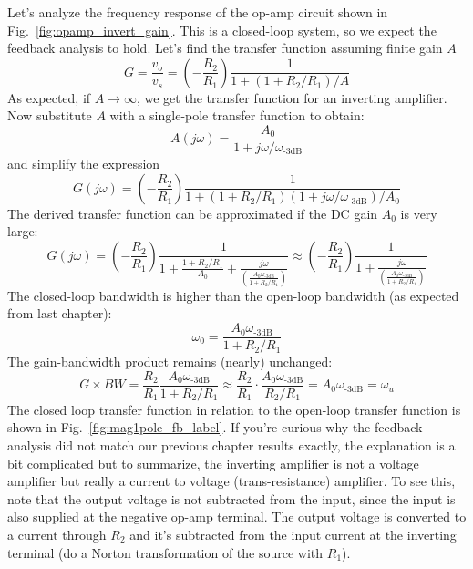 Let's analyze the frequency response of the op-amp circuit shown in Fig.~\ref{fig:opamp_invert_gain}.  This is a closed-loop system, so we expect the feedback analysis to hold.  Let's find the transfer function assuming finite gain $A$
\begin{equation}
  G = \frac{v_o}{v_s} = \left(-\frac{R_2}{R_1}\right) \frac{1}{1 + (1+R_2/R_1)/A}
\end{equation}
As expected, if $A \rightarrow \infty$, we get the transfer function for an inverting amplifier.  Now  substitute $A$ with a single-pole transfer function to obtain:
\begin{equation} 
	A(j\omega) = \frac{A_0}{1 + j\omega/\omega_{\text{-3dB}}}
\end{equation}
and simplify the expression 
\begin{equation}
  G(j\omega) = \left(-\frac{R_2}{R_1}\right)  \frac{1}{1 + (1+R_2/R_1)(1+ j\omega/\omega_\text{-3dB})/A_0}
\end{equation}
The derived transfer function can be approximated if the DC gain $A_0$ is very large:
\begin{equation}
  G(j\omega) = \left(-\frac{R_2}{R_1}\right)  \frac{1}{1 + \frac{1+R_2/R_1}{A_0} + 
    \frac{j\omega}{\left( \frac{A_0 \omega_\text{-3dB}}{1 + R_2/R_1} \right)}} \approx
     \left(-\frac{R_2}{R_1}\right)\frac{1}{1 + \frac{j\omega}{\left( \frac{A_0 \omega_\text{-3dB}}{1 + R_2/R_1} \right)}}
\end{equation}
The closed-loop bandwidth is higher than the open-loop bandwidth (as expected from last chapter):
\begin{equation} 
	\omega_{0} = \frac{A_0 \omega_{\text{-3dB}}}{ 1 + R_2/R_1} 
\end{equation}
The gain-bandwidth product remains (nearly) unchanged:
\begin{equation} 
	G \times BW = \frac{R_2}{R_1} \frac{A_0 \omega_\text{-3dB}}{ 1 + R_2/R_1} \approx \frac{R_2}{R_1}
    \cdot \frac{A_0 \omega_\text{-3dB}}{R_2/R_1} = A_0 \omega_\text{-3dB} = \omega_u
\end{equation}
The closed loop transfer function in relation to the open-loop transfer function is shown in Fig.~\ref{fig:mag1pole_fb_label}.  If you're curious why the feedback analysis did not match our previous chapter results exactly, the explanation is a bit complicated but to summarize, the inverting amplifier is not a voltage amplifier but really a current to voltage (trans-resistance) amplifier.  To see this, note that the output voltage is not subtracted from the input, since the input is also supplied at the negative op-amp terminal. The output voltage is converted to a current through $R_2$ and it's subtracted from the input current at the inverting terminal (do a Norton transformation of the source with $R_1$).
